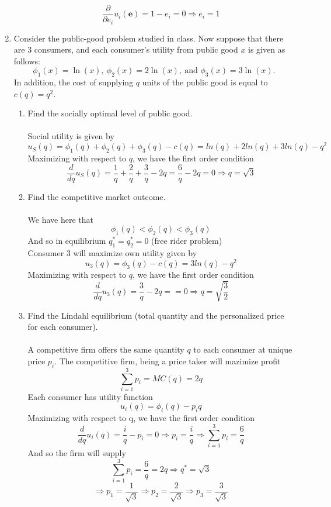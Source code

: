 \documentclass[11pt]{article}
\begin{document}
\begin{enumerate}
\begin{enumerate}
    $$\dfrac{\partial}{\partial e_i}u_i(\textbf{e})=1-e_i=0\Rightarrow e_i=1$$
    \end{enumerate}
\pagebreak
\item Consider the public-good problem studied in class. Now suppose that there are 3 consumers, and each consumer's utility from public good $x$ is given as follows:
    \begin{equation*}
    \phi_{1}(x)=\ln(x),~\phi_{2}(x)=2\ln(x),~\text{and }\phi_{3}(x)=3\ln(x).
    \end{equation*}
    In addition, the cost of supplying $q$ units of the public good is equal to $c(q)=q^{2}$.
    \begin{enumerate}
    \item Find the socially optimal level of public good.\\\\
    Social utility is given by\\
    $$u_S(q)=\phi_1(q)+\phi_2(q)+\phi_3(q)-c(q)=ln(q)+2ln(q)+3ln(q)-q^2$$
    Maximizing with respect to $q$, we have the first order condition\\
    $$\dfrac{d}{dq}u_S(q)=\dfrac{1}{q}+\dfrac{2}{q}+\dfrac{3}{q}-2q=\dfrac{6}{q}-2q=0\Rightarrow q=\sqrt{3}$$
    \item Find the competitive market outcome.\\\\
    We have here that\\
    $$\phi_1(q)<\phi_2(q)<\phi_3(q)$$
    And so in equilibrium $q_1^*=q_2^*=0$ (free rider problem)\\
    Consumer 3 will maximize own utility given by\\
    $$u_3(q)=\phi_3(q)-c(q)=3ln(q)-q^2$$
    Maximizing with respect to $q$, we have the first order condition\\
    $$\dfrac{d}{dq}u_3(q)=\dfrac{3}{q}-2q==0\Rightarrow q=\sqrt{\dfrac{3}{2}}$$
    \item Find the Lindahl equilibrium (total quantity and the personalized price for each consumer).\\\\
    A competitive firm offers the same quantity $q$ to each consumer at unique price $p_i$.  
    The competitive firm, being a price taker will mazimize profit\\
    $$\sum_{i=1}^3p_i=MC(q)=2q$$
    Each consumer has utility function\\
    $$u_i(q)=\phi_i(q)-p_iq$$
    Maximizing with respect to q, we have the first order condition\\
    $$\dfrac{d}{dq}u_i(q)=\dfrac{i}{q}-p_i=0\Rightarrow p_i=\dfrac{i}{q}\Rightarrow\sum_{i=1}^3p_i=\dfrac{6}{q}$$
    And so the firm will supply\\
    $$\sum_{i=1}^3p_i=\dfrac{6}{q}=2q\Rightarrow q^*=\sqrt{3}$$
    $$\Rightarrow p_1=\dfrac{1}{\sqrt{3}}\Rightarrow p_2=\dfrac{2}{\sqrt{3}}\Rightarrow p_3=\dfrac{3}{\sqrt{3}}$$
    \end{enumerate}
\end{enumerate}
\end{document}

